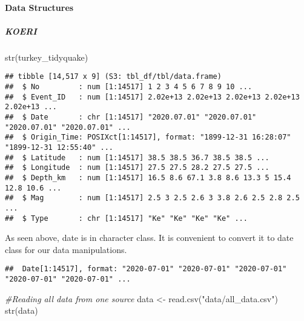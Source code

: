 \documentclass[
]{article}
\newenvironment{Shaded}{\begin{snugshade}}{\end{snugshade}}
\newcommand{\AttributeTok}[1]{\textcolor[rgb]{0.77,0.63,0.00}{#1}}
\newcommand{\CommentTok}[1]{\textcolor[rgb]{0.56,0.35,0.01}{\textit{#1}}}
\newcommand{\FunctionTok}[1]{\textcolor[rgb]{0.00,0.00,0.00}{#1}}
\newcommand{\NormalTok}[1]{#1}
\newcommand{\OtherTok}[1]{\textcolor[rgb]{0.56,0.35,0.01}{#1}}
\newcommand{\SpecialCharTok}[1]{\textcolor[rgb]{0.00,0.00,0.00}{#1}}
\newcommand{\StringTok}[1]{\textcolor[rgb]{0.31,0.60,0.02}{#1}}
\begin{document}
\hypertarget{data-structures}{%
\paragraph{Data Structures}\label{data-structures}}

\hypertarget{koeri}{%
\subparagraph{KOERI}\label{koeri}}

\begin{Shaded}
\begin{Highlighting}[]
\FunctionTok{str}\NormalTok{(turkey\_tidyquake)}
\end{Highlighting}
\end{Shaded}

\begin{verbatim}
## tibble [14,517 x 9] (S3: tbl_df/tbl/data.frame)
##  $ No         : num [1:14517] 1 2 3 4 5 6 7 8 9 10 ...
##  $ Event_ID   : num [1:14517] 2.02e+13 2.02e+13 2.02e+13 2.02e+13 2.02e+13 ...
##  $ Date       : chr [1:14517] "2020.07.01" "2020.07.01" "2020.07.01" "2020.07.01" ...
##  $ Origin_Time: POSIXct[1:14517], format: "1899-12-31 16:28:07" "1899-12-31 12:55:40" ...
##  $ Latitude   : num [1:14517] 38.5 38.5 36.7 38.5 38.5 ...
##  $ Longitude  : num [1:14517] 27.5 27.5 28.2 27.5 27.5 ...
##  $ Depth_km   : num [1:14517] 16.5 8.6 67.1 3.8 8.6 13.3 5 15.4 12.8 10.6 ...
##  $ Mag        : num [1:14517] 2.5 3 2.5 2.6 3 3.8 2.6 2.5 2.8 2.5 ...
##  $ Type       : chr [1:14517] "Ke" "Ke" "Ke" "Ke" ...
\end{verbatim}

As seen above, date is in character class. It is convenient to convert
it to date class for our data manipulations.

\begin{Shaded}
\end{Shaded}

\begin{verbatim}
##  Date[1:14517], format: "2020-07-01" "2020-07-01" "2020-07-01" "2020-07-01" "2020-07-01" ...
\end{verbatim}

\begin{Shaded}
\begin{Highlighting}[]
\CommentTok{\#Reading all data from one source}
\NormalTok{data }\OtherTok{\textless{}{-}} \FunctionTok{read.csv}\NormalTok{(}\StringTok{"data/all\_data.csv"}\NormalTok{)}
\FunctionTok{str}\NormalTok{(data)}
\end{Highlighting}
\end{Shaded}
\end{document}
